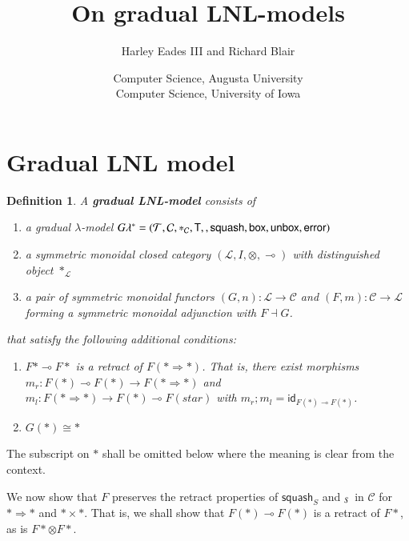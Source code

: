 \documentclass{article}
\date{}
\newtheorem{definition}[theorem]{Definition}
\let\mto\to
\let\to\relax
\newcommand{\to}{\rightarrow}
\let\split\relax
\newcommand{\cat}[1]{\mathcal{#1}}
\newcommand{\id}[0]{\mathsf{id}}
\newcommand{\lolli}{\multimap}
\newcommand{\T}[0]{\mathsf{T}}
\newcommand{\split}[0]{\mathsf{split}}
\newcommand{\squash}[0]{\mathsf{squash}}
\newcommand{\bx}[0]{\mathsf{box}}
\newcommand{\error}[0]{\mathsf{error}}
\newcommand{\unbox}[0]{\mathsf{unbox}}
\begin{document}
\title{\vspace{-45px}On gradual LNL-models}
\author{Harley Eades III and Richard Blair}
\date{Computer Science, Augusta University\\Computer Science, University of Iowa}

\maketitle 

\section{Gradual LNL model}

\begin{definition} A \textbf{gradual LNL-model} consists of
  \begin{enumerate}
  \item a gradual $\lambda$-model $G\lambda^\ast = (\cat{T}, \cat{C}, \ast_{\cat{C}}, \T, \split, \squash, \bx, \unbox, \error)$
  \item a symmetric monoidal closed category $(\cat{L}, I, \otimes, \multimap)$ with distinguished object $\ast_{\cat{L}}$
  \item a pair of symmetric monoidal functors $(G, n) : \cat{L} \mto \cat{C}$ and $(F, m) : \cat{C} \mto \cat{L}$ forming a symmetric monoidal adjunction with $F \dashv G$.
  \end{enumerate}
  that satisfy the following additional conditions:
  \begin{enumerate}
  \item $F\ast \lolli F\ast$ is a retract of $F(\ast \Rightarrow \ast)$. That is, there exist morphisms $m_r : F(\ast) \lolli F(\ast) \mto F(\ast \Rightarrow \ast)$ and $m_l : F(\ast \Rightarrow \ast) \mto F(\ast) \lolli F(star)$ with $m_r ; m_l = \id_{F(\ast) \lolli F(\ast)}$.
  \item $G(\ast) \cong \ast$
  \end{enumerate}

\end{definition}

The subscript on $\ast$ shall be omitted below where the meaning is clear from the context.

We now show that $F$ preserves the retract properties of $\squash_S$ and $\split_S$ in $\cat{C}$ for $\ast \Rightarrow \ast$ and $\ast \times \ast$. That is, we shall show that $F(\ast) \lolli F(\ast)$ is a retract of $F\ast$, as is $F\ast \otimes F\ast$.
\end{document}
